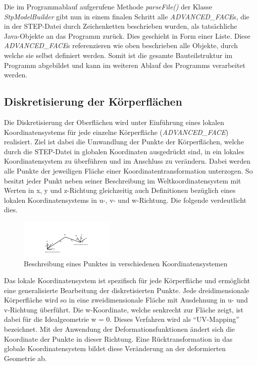 Die im Programmablauf aufgerufene Methode \textit{parseFile()} der Klasse \textit{StpModelBuilder} gibt nun in einem finalen Schritt alle \textit{ADVANCED\_FACE}s, die in der STEP-Datei durch Zeichenketten beschrieben wurden, als tatsächliche Java-Objekte an das Programm zurück. Dies geschieht in Form einer Liste. Diese \textit{ADVANCED\_FACE}s  referenzieren wie oben beschrieben alle Objekte, durch welche sie selbst definiert werden. Somit ist die gesamte Bauteilstruktur im Programm abgebildet und kann im weiteren Ablauf des Programms verarbeitet werden.

\subsection{Diskretisierung der Körperflächen}

Die Diskretisierung der Oberflächen wird unter Einführung eines lokalen Koordinatensystems für jede einzelne Körperfläche (\textit{ADVANCED\_FACE}) realisiert.
Ziel ist dabei die Umwandlung der Punkte der Körperflächen, welche durch die STEP-Datei in globalen Koordinaten ausgedrückt sind, in ein lokales Koordinatensystem zu überführen und im Anschluss zu verändern. Dabei werden alle Punkte der jeweiligen Fläche einer Koordinatentransformation unterzogen. So besitzt jeder Punkt neben seiner Beschreibung im Weltkoordinatensystem mit Werten in x, y und z-Richtung gleichzeitig auch Definitionen bezüglich eines lokalen Koordinatensystems in u-, v- und w-Richtung. Die folgende  verdeutlicht dies. 

\begin{figure}[h]
	\centering
	
	\includegraphics[width=0.7\linewidth]{img/basetrafo.pdf}
	
	\caption{Beschreibung eines Punktes in verschiedenen Koordinatensystemen}
	\label{fig:basetrafo}
	
\end{figure}

Das lokale Koordinatensystem ist spezifisch für jede Körperfläche und ermöglicht eine generalisierte Bearbeitung der diskretisierten Punkte. Jede dreidimensionale Körperfläche wird so in eine zweidimensionale Fläche mit Ausdehnung in u- und v-Richtung überführt. Die w-Koordinate, welche senkrecht zur Fläche zeigt, ist dabei für die Idealgeometrie w = 0. Dieses Verfahren wird als "`UV-Mapping"' bezeichnet. Mit der Anwendung der Deformationsfunktionen ändert sich die Koordinate der Punkte in dieser Richtung. Eine Rücktransformation in das globale Koordinatensystem bildet diese Veränderung an der deformierten Geometrie ab.       

